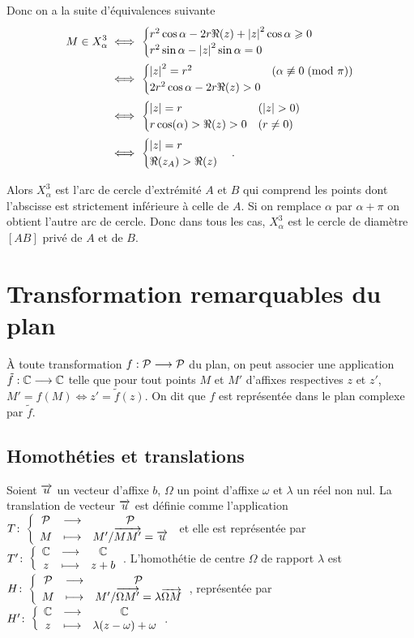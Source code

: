Donc on a la suite d'équivalences suivante
\begin{align}
  M \in X_{\alpha}^3 
  & \iff 
  \begin{cases}
    r^2\cos \alpha - 2r\Re(z) + \left\lvert z\right\rvert^2\cos \alpha \geqslant 0 \\ 
    r^2\sin \alpha - \left\lvert z\right\rvert^2\sin \alpha = 0
  \end{cases}\\
  & \iff
  \begin{cases}
    \left\lvert z\right\rvert^2 = r^2 & (\alpha \not\equiv 0\!\pmod {\pi}) \\ 
    2r^2\cos \alpha - 2r \Re(z)>0&
  \end{cases}\\
  & \iff
  \begin{cases}
    \left\lvert z\right\rvert = r & (\left\lvert z\right\rvert>0)\\ r\cos(\alpha) > \Re(z)>0 & 
    (r\neq 0)
  \end{cases}\\
  & \iff
  \begin{cases}
    \left\lvert z\right\rvert = r \\ \Re(z_A) > \Re(z)
  \end{cases}.
\end{align}

Alors \(X_{\alpha}^{3}\) est l'arc de cercle d'extrémité \(A\) et \(B\) qui 
comprend les points dont l'abscisse est strictement inférieure à celle de 
\(A\).  Si on remplace \(\alpha\) par \(\alpha + \pi\) on obtient l'autre 
arc de cercle.  Donc dans tous les cas, \(X_{\alpha}^3\) est le cercle de 
diamètre \([AB]\) privé de \(A\) et de \(B\).

\section{Transformation remarquables du plan}

À toute transformation \(f:\mathcal{P} \longrightarrow \mathcal{P}\) du plan, on peut associer une 
application \(\tilde{f}:\mathbb{C} \longrightarrow \mathbb{C}\) telle que pour tout points \(M\) 
et \(M'\) d'affixes respectives \(z\) et \(z'\), \(M' = f(M) \iff z' = 
\tilde{f}(z)\). On dit que \(f\) est représentée dans le plan complexe par 
\(\tilde{f}\).

\subsection{Homothéties et translations}

\begin{defdef}
  Soient \(\overrightarrow{u}\) un vecteur d'affixe \(b\), \(\Omega\) un point d'affixe 
  \(\omega\) et \(\lambda\) un réel non nul. La translation de vecteur 
  \(\overrightarrow{u}\) est définie comme l'application \(T\colon \left\{\begin{array}{ccc} \mathcal{P} & \longrightarrow &\mathcal{P}\\ M & \longmapsto & M' / 
  \overrightarrow{MM'} = \overrightarrow{u} \end{array} \right.\) et elle est représentée par 
  \(T'\colon \left\{\begin{array}{ccc} \mathbb{C} & \longrightarrow &\mathbb{C}\\ z & \longmapsto & z + b \end{array} \right.\).  L'homothétie de centre \(\Omega\) de 
  rapport \(\lambda\) est \(H\colon \left\{\begin{array}{ccc} \mathcal{P} & \longrightarrow &\mathcal{P}\\ M & \longmapsto & M' / \overrightarrow{\Omega M'} = 
  \lambda \overrightarrow{\Omega M} \end{array} \right.\), représentée par 
  \(H'\colon \left\{\begin{array}{ccc} \mathbb{C} & \longrightarrow &\mathbb{C}\\ z & \longmapsto & \lambda(z - \omega) + \omega \end{array} \right.\).
\end{defdef}

